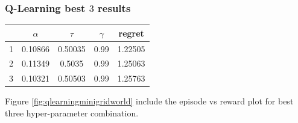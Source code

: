 \documentclass[11pt, a4]{article}
\begin{document}
			\subsubsection{Q-Learning best $3$ results}
				\begin{center}
					\begin{tabular}{|c|c|c|c|c|}
						\hline
						& $\alpha$ & $\tau$ & $\gamma$ & regret\\
						\hline
						1 & 0.10866 & 0.50035 & 0.99 & 1.22505\\
						\hline
						2 & 0.11349 & 0.5035 & 0.99 & 1.25063\\
						\hline
						3 & 0.10321 & 0.50503 & 0.99 & 1.25763\\
						\hline
					\end{tabular}
				\end{center}
				Figure \ref{fig:qlearningminigridworld} include the episode vs reward plot for best three hyper-parameter combination.
\end{document}
